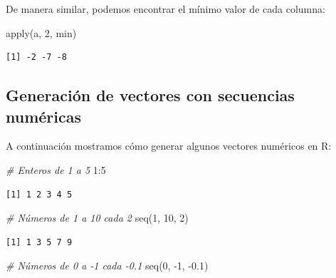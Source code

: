 \documentclass[
]{book}
\newenvironment{Shaded}{\begin{snugshade}}{\end{snugshade}}
\newcommand{\CommentTok}[1]{\textcolor[rgb]{0.56,0.35,0.01}{\textit{#1}}}
\newcommand{\DecValTok}[1]{\textcolor[rgb]{0.00,0.00,0.81}{#1}}
\newcommand{\FloatTok}[1]{\textcolor[rgb]{0.00,0.00,0.81}{#1}}
\newcommand{\FunctionTok}[1]{\textcolor[rgb]{0.00,0.00,0.00}{#1}}
\newcommand{\NormalTok}[1]{#1}
\newcommand{\SpecialCharTok}[1]{\textcolor[rgb]{0.00,0.00,0.00}{#1}}
\begin{document}
De manera similar, podemos encontrar el mínimo valor de cada columna:

\begin{Shaded}
\begin{Highlighting}[]
\FunctionTok{apply}\NormalTok{(a, }\DecValTok{2}\NormalTok{, min)}
\end{Highlighting}
\end{Shaded}

\begin{verbatim}
[1] -2 -7 -8
\end{verbatim}

\hypertarget{generaciuxf3n-de-vectores-con-secuencias-numuxe9ricas}{%
\subsection{Generación de vectores con secuencias numéricas}\label{generaciuxf3n-de-vectores-con-secuencias-numuxe9ricas}}

A continuación mostramos cómo generar algunos vectores numéricos en R:

\begin{Shaded}
\begin{Highlighting}[]
\CommentTok{\# Enteros de 1 a 5}
\DecValTok{1}\SpecialCharTok{:}\DecValTok{5}
\end{Highlighting}
\end{Shaded}

\begin{verbatim}
[1] 1 2 3 4 5
\end{verbatim}

\begin{Shaded}
\begin{Highlighting}[]
\CommentTok{\# Números de 1 a 10 cada 2}
\FunctionTok{seq}\NormalTok{(}\DecValTok{1}\NormalTok{, }\DecValTok{10}\NormalTok{, }\DecValTok{2}\NormalTok{)}
\end{Highlighting}
\end{Shaded}

\begin{verbatim}
[1] 1 3 5 7 9
\end{verbatim}

\begin{Shaded}
\begin{Highlighting}[]
\CommentTok{\# Números de 0 a {-}1 cada {-}0.1}
\FunctionTok{seq}\NormalTok{(}\DecValTok{0}\NormalTok{, }\SpecialCharTok{{-}}\DecValTok{1}\NormalTok{, }\SpecialCharTok{{-}}\FloatTok{0.1}\NormalTok{)}
\end{Highlighting}
\end{Shaded}
\end{document}
